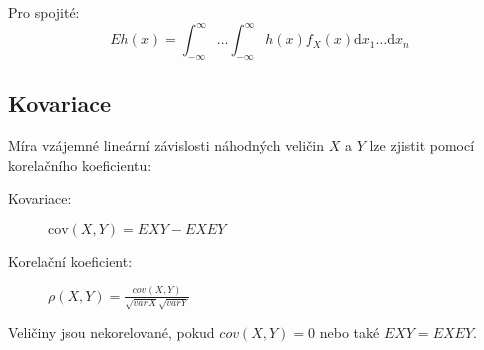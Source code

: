 Pro spojité:
$$
    Eh(x) = \int_{-\infty}^{\infty}{\dots}\int_{-\infty}^{\infty}{h(x)f_X(x)\textrm{d}x_1 \dots \textrm{d}x_n}
$$

\subsection{Kovariace}

Míra vzájemné lineární závislosti náhodných veličin $X$ a $Y$ lze zjistit pomocí korelačního koeficientu:

\begin{description}
    \item[Kovariace:] $\textrm{cov}(X,Y) = EXY - EXEY$
    \item[Korelační koeficient:] $\rho(X,Y) = \frac{cov(X,Y)}{\sqrt{var X}\sqrt{var Y}}$
\end{description}

Veličiny jsou nekorelované, pokud $cov(X,Y) = 0$ nebo také $EXY = EXEY$.